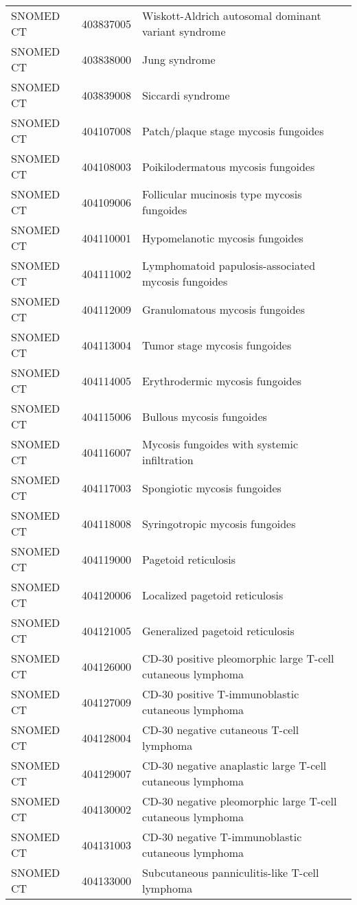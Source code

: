 \begin{table}[ht]
\begin{tabular}{lll}
  SNOMED CT & 403837005 & Wiskott-Aldrich autosomal dominant variant syndrome \\ 
  SNOMED CT & 403838000 & Jung syndrome \\ 
  SNOMED CT & 403839008 & Siccardi syndrome \\ 
  SNOMED CT & 404107008 & Patch/plaque stage mycosis fungoides \\ 
  SNOMED CT & 404108003 & Poikilodermatous mycosis fungoides \\ 
  SNOMED CT & 404109006 & Follicular mucinosis type mycosis fungoides \\ 
  SNOMED CT & 404110001 & Hypomelanotic mycosis fungoides \\ 
  SNOMED CT & 404111002 & Lymphomatoid papulosis-associated mycosis fungoides \\ 
  SNOMED CT & 404112009 & Granulomatous mycosis fungoides \\ 
  SNOMED CT & 404113004 & Tumor stage mycosis fungoides \\ 
  SNOMED CT & 404114005 & Erythrodermic mycosis fungoides \\ 
  SNOMED CT & 404115006 & Bullous mycosis fungoides \\ 
  SNOMED CT & 404116007 & Mycosis fungoides with systemic infiltration \\ 
  SNOMED CT & 404117003 & Spongiotic mycosis fungoides \\ 
  SNOMED CT & 404118008 & Syringotropic mycosis fungoides \\ 
  SNOMED CT & 404119000 & Pagetoid reticulosis \\ 
  SNOMED CT & 404120006 & Localized pagetoid reticulosis \\ 
  SNOMED CT & 404121005 & Generalized pagetoid reticulosis \\ 
  SNOMED CT & 404126000 & CD-30 positive pleomorphic large T-cell cutaneous lymphoma \\ 
  SNOMED CT & 404127009 & CD-30 positive T-immunoblastic cutaneous lymphoma \\ 
  SNOMED CT & 404128004 & CD-30 negative cutaneous T-cell lymphoma \\ 
  SNOMED CT & 404129007 & CD-30 negative anaplastic large T-cell cutaneous lymphoma \\ 
  SNOMED CT & 404130002 & CD-30 negative pleomorphic large T-cell cutaneous lymphoma \\ 
  SNOMED CT & 404131003 & CD-30 negative T-immunoblastic cutaneous lymphoma \\ 
  SNOMED CT & 404133000 & Subcutaneous panniculitis-like T-cell lymphoma \\ 

\end{tabular}
\end{table}
